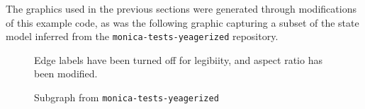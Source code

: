 The graphics used in the previous sections were generated through modifications of this example code, as was the following graphic capturing a subset of the state model inferred from the \texttt{monica-tests-yeagerized} repository.

\begin{figure}
  \noindent{}
  \caption{Subgraph from \texttt{monica-tests-yeagerized}}
  Edge labels have been turned off for legibiity, and aspect ratio has been modified.
\end{figure}
